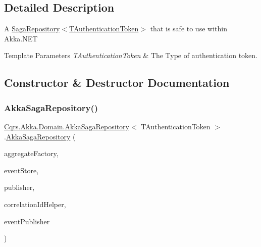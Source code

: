 \subsection{Detailed Description}
A \hyperlink{classCqrs_1_1Domain_1_1SagaRepository_a2981231b25fa89133ab50796cd352fbf_a2981231b25fa89133ab50796cd352fbf}{Saga\+Repository$<$\+T\+Authentication\+Token$>$} that is safe to use within Akka.\+N\+ET 


\begin{DoxyTemplParams}{Template Parameters}
{\em T\+Authentication\+Token} & The Type of authentication token.\\
\hline
\end{DoxyTemplParams}


\subsection{Constructor \& Destructor Documentation}
\mbox{\label{classCqrs_1_1Akka_1_1Domain_1_1AkkaSagaRepository_a8297f64e2b7a7be7bcc999c89dcece05_a8297f64e2b7a7be7bcc999c89dcece05}} 
\subsubsection{\texorpdfstring{Akka\+Saga\+Repository()}{AkkaSagaRepository()}}
{\footnotesize\ttfamily \hyperlink{classCqrs_1_1Akka_1_1Domain_1_1AkkaSagaRepository}{Cqrs.\+Akka.\+Domain.\+Akka\+Saga\+Repository}$<$ T\+Authentication\+Token $>$.\hyperlink{classCqrs_1_1Akka_1_1Domain_1_1AkkaSagaRepository}{Akka\+Saga\+Repository} (\begin{DoxyParamCaption}\item[{\hyperlink{interfaceCqrs_1_1Domain_1_1Factories_1_1IAggregateFactory}{I\+Aggregate\+Factory}}]{aggregate\+Factory,  }\item[{\hyperlink{interfaceCqrs_1_1Events_1_1IEventStore}{I\+Event\+Store}$<$ T\+Authentication\+Token $>$}]{event\+Store,  }\item[{\hyperlink{interfaceCqrs_1_1Events_1_1IEventPublisher}{I\+Event\+Publisher}$<$ T\+Authentication\+Token $>$}]{publisher,  }\item[{I\+Correlation\+Id\+Helper}]{correlation\+Id\+Helper,  }\item[{\hyperlink{interfaceCqrs_1_1Akka_1_1Events_1_1IAkkaEventPublisherProxy}{I\+Akka\+Event\+Publisher\+Proxy}$<$ T\+Authentication\+Token $>$}]{event\+Publisher }\end{DoxyParamCaption})}



